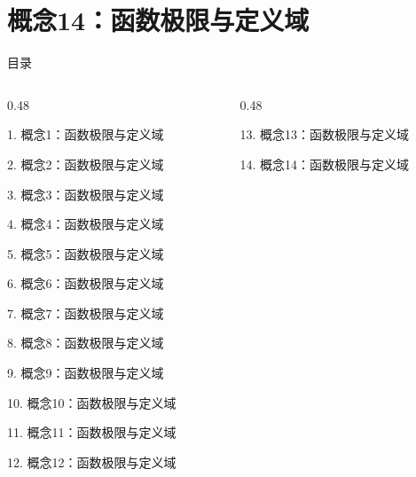 \documentclass[aspectratio=169,10pt,fontset=fandol]{ctexbeamer}
\begin{document}
\section{概念14：函数极限与定义域}
\begin{frame}[t,fragile]{目录}
\small
\begin{columns}[T,onlytextwidth]
\begin{column}{0.48\textwidth}
{\color{black}\small 1. 概念1：函数极限与定义域\par}\vspace{0.22em}
{\color{black}\small 2. 概念2：函数极限与定义域\par}\vspace{0.22em}
{\color{black}\small 3. 概念3：函数极限与定义域\par}\vspace{0.22em}
{\color{black}\small 4. 概念4：函数极限与定义域\par}\vspace{0.22em}
{\color{black}\small 5. 概念5：函数极限与定义域\par}\vspace{0.22em}
{\color{black}\small 6. 概念6：函数极限与定义域\par}\vspace{0.22em}
{\color{black}\small 7. 概念7：函数极限与定义域\par}\vspace{0.22em}
{\color{black}\small 8. 概念8：函数极限与定义域\par}\vspace{0.22em}
{\color{black}\small 9. 概念9：函数极限与定义域\par}\vspace{0.22em}
{\color{black}\small 10. 概念10：函数极限与定义域\par}\vspace{0.22em}
{\color{black}\small 11. 概念11：函数极限与定义域\par}\vspace{0.22em}
{\color{black}\small 12. 概念12：函数极限与定义域\par}\vspace{0.22em}
\end{column}
\begin{column}{0.48\textwidth}
{\color{black}\small 13. 概念13：函数极限与定义域\par}\vspace{0.22em}
{\color{blue}\small 14. 概念14：函数极限与定义域\par}\vspace{0.22em}

\end{column}
\end{columns}
\end{frame}
\end{document}
